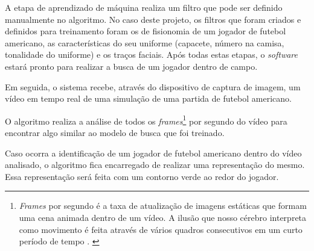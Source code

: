 A etapa de aprendizado de máquina realiza um filtro que pode ser definido manualmente no algoritmo. No caso deste projeto, os filtros que foram criados e definidos para treinamento foram os de fisionomia de um jogador de futebol americano, as características do seu uniforme (capacete, número na camisa, tonalidade do uniforme) e os traços faciais. Após todas estas etapas, o \textit{software} estará pronto para realizar a busca de um jogador dentro de campo.

Em seguida, o sistema recebe, através do dispositivo de captura de imagem, um vídeo em tempo real de uma simulação de uma partida de futebol americano.

O algoritmo realiza a análise de todos os \textit{frames}\footnote{\textit{Frames} por segundo é a taxa de atualização de imagens estáticas que formam uma cena animada dentro de um vídeo. A ilusão que nosso cérebro interpreta como movimento é feita através de vários quadros consecutivos em um curto período de tempo \cite{FRAMES2011}. \label{frames-por-segundo}} por segundo do vídeo para encontrar algo similar ao modelo de busca que foi treinado.

Caso ocorra a identificação de um jogador de futebol americano dentro do vídeo analisado, o algoritmo fica encarregado de realizar uma representação do mesmo. Essa representação será feita com um contorno verde ao redor do jogador.